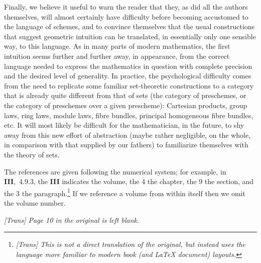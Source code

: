 \sectionbreak

Finally, we believe it useful to warn the reader that they, as did all the authors themselves, will almost certainly have difficulty before becoming accustomed to the language of schemes, and to convince themselves that the usual constructions that suggest geometric intuition can be translated, in essentially only one sensible way, to this language.
As in many parts of modern mathematics, the first intuition seems further and further away, in appearance, from the correct language needed to express the mathematics in question with complete precision and the desired level of generality.
In practice, the psychological difficulty comes from the need to replicate some familiar set-theoretic constructions to a category that is already quite different from that of sets (the category of preschemes, or the category of preschemes over a given prescheme): Cartesian products, group laws, ring laws, module laws, fibre bundles, principal homogeneous fibre bundles, etc.
It will most likely be difficult for the mathematician, in the future, to shy away from this new effort of abstraction (maybe rather negligible, on the whole, in comparison with that supplied by our fathers) to familiarize themselves with the theory of sets.

\sectionbreak

The references are given following the numerical system; for example, in \textbf{III},~4.9.3, the \textbf{III} indicates the volume, the 4 the chapter, the 9 the section, and the 3 the paragraph.\footnote{\emph{[Trans] This is not a direct translation of the original, but instead uses the language more familiar to modern book (and \LaTeX{} document) layouts.}}
If we reference a volume from within itself then we omit the volume number.

\bigskip

\emph{[Trans] Page 10 in the original is left blank.}






